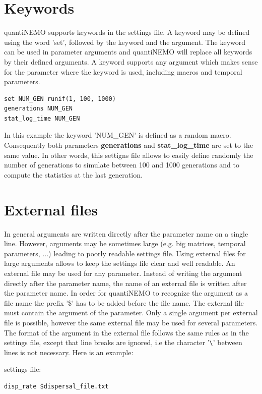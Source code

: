 \documentclass[letterpaper,12pt,oneside]{book}
\begin{document}
\section{Keywords}
quantiNEMO supports keywords in the settings file. A keyword may be defined using the word 'set', followed by the keyword and the argument. The keyword can  be used in parameter arguments and quantiNEMO will replace all keywords by their defined arguments. A keyword supports any argument which makes sense for the parameter where the keyword is used, including macros and temporal parameters.

\begin{lstlisting}[frame=single]
set NUM_GEN runif(1, 100, 1000)
generations NUM_GEN
stat_log_time NUM_GEN
\end{lstlisting}
In this example the keyword 'NUM\_GEN' is defined as a random macro. Consequently both parameters \textbf{generations} and \textbf{stat\_log\_time} are set to the same value. In other words, this settigns file allows to easily define randomly the number of generations to simulate between 100 and 1000 generations and to compute the statistics at the last generation.

\section{External files} \index{\$}
In general arguments are written directly after the parameter name on a single line. However, arguments may be sometimes large (e.g. big matrices, temporal parameters, ...) leading to poorly readable settings file. Using external files for large arguments allows to keep the settings file clear and well readable. An external file may be used for any parameter. Instead of writing the argument directly after the parameter name, the name of an external file is written after the parameter name. In order for quantiNEMO to recognize the argument as a file name the prefix '\$' has to be added before the file name. The external file must contain the argument of the parameter. Only a single argument per external file is possible, however the same external file may be used for several parameters. The format of the argument in the external file follows the same rules as in the settings file, except that line breaks are ignored, i.e the character '\verb"\"' between lines is not necessary. Here is an example:

settings file:
\begin{lstlisting}[frame=single]
disp_rate $dispersal_file.txt
\end{lstlisting}
\end{document}
